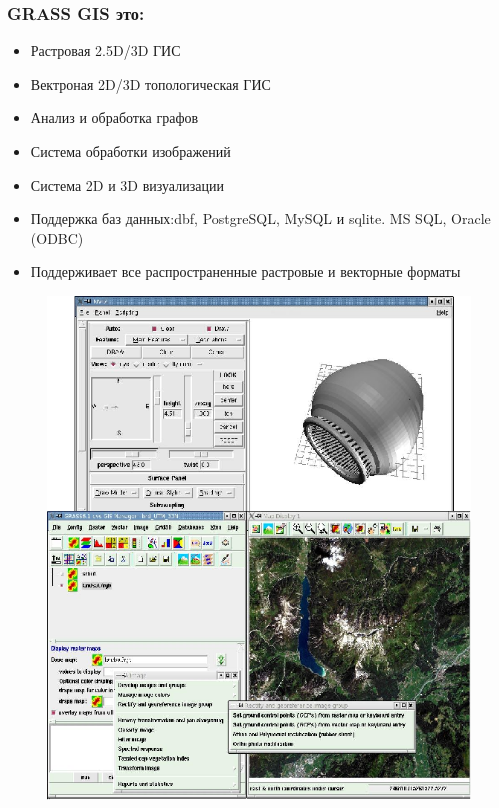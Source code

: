 \begin{frame}
\frametitle{GRASS GIS это:}
\begin{multicols}{2}
\begin{itemize}
\item Растровая 2.5D/3D ГИС
\item  Вектроная 2D/3D топологическая ГИС
\item Анализ и обработка графов
\item Система обработки изображений
\item Система 2D и 3D визуализации
\item Поддержка баз данных:dbf, PostgreSQL, MySQL и sqlite. MS SQL, Oracle (ODBC)
\item Поддерживает все распространенные растровые и векторные форматы
\end{itemize}
\begin{figure}[!ht]
          \begin{center}
            \includegraphics[width=\columnwidth]{./grass/img/views.png}
        \end{center}
\end{figure}
\end{multicols}
\end{frame}


